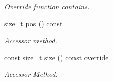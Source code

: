 \begin{DoxyCompactItemize}
\begin{DoxyCompactList}\small\item\em Override function contains. \end{DoxyCompactList}\item 
size\+\_\+t \hyperlink{class_sentence_af98c9ff5c5be578e7e45057ebd9b899b}{pos} () const
\begin{DoxyCompactList}\small\item\em Accessor method. \end{DoxyCompactList}\item 
const size\+\_\+t \hyperlink{class_sentence_a98d70a10b7573aa295814d1326ed1164}{size} () const override
\begin{DoxyCompactList}\small\item\em Accessor Method. \end{DoxyCompactList}\end{DoxyCompactItemize}

